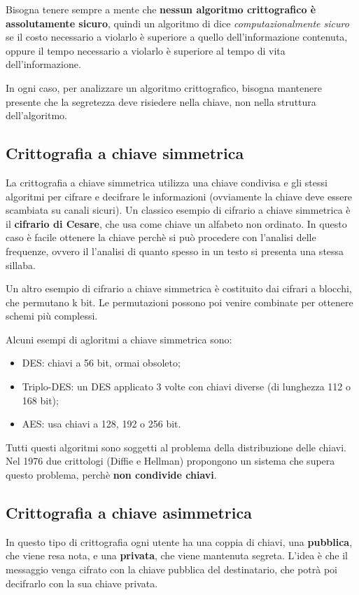 \documentclass[a4paper, 11pt]{article}
\begin{document}
\begin{multicols}{2}
		Bisogna tenere sempre a mente che \textbf{nessun algoritmo crittografico è assolutamente sicuro}, quindi un algoritmo di dice \textit{computazionalmente sicuro} se il costo necessario a violarlo è superiore a quello dell'informazione contenuta, oppure il tempo necessario a violarlo è superiore al tempo di vita dell'informazione.
		
		In ogni caso, per analizzare un algoritmo crittografico, bisogna mantenere presente che la segretezza deve risiedere nella chiave, non nella struttura dell'algoritmo.
		
		\subsection{Crittografia a chiave simmetrica}
		La crittografia a chiave simmetrica utilizza una chiave condivisa e gli stessi algoritmi per cifrare e decifrare le informazioni (ovviamente la chiave deve essere scambiata su canali sicuri).
		Un classico esempio di cifrario a chiave simmetrica è il \textbf{cifrario di Cesare}, che usa come chiave un alfabeto non ordinato. In questo caso è facile ottenere la chiave perchè si può procedere con l'analisi delle frequenze, ovvero il l'analisi di quanto spesso in un testo si presenta una stessa sillaba.
		
		Un altro esempio di cifrario a chiave simmetrica è costituito dai cifrari a blocchi, che permutano k bit. Le permutazioni possono poi venire combinate per ottenere schemi più complessi.
		
		Alcuni esempi di agloritmi a chiave simmetrica sono:
		\begin{itemize}
			\item DES: chiavi a 56 bit, ormai obsoleto;
			\item Triplo-DES: un DES applicato 3 volte con chiavi diverse (di lunghezza 112 o 168 bit);
			\item AES: usa chiavi a 128, 192 o 256 bit.
		\end{itemize}
	
		Tutti questi algoritmi sono soggetti al problema della distribuzione delle chiavi. Nel 1976 due crittologi (Diffie e Hellman) propongono un sistema che supera questo problema, perchè \textbf{non condivide chiavi}.
		
		\subsection{Crittografia a chiave asimmetrica}
		In questo tipo di crittografia ogni utente ha una coppia di chiavi, una \textbf{pubblica}, che viene resa nota, e una \textbf{privata}, che viene mantenuta segreta. L'idea è che il messaggio venga cifrato con la chiave pubblica del destinatario, che potrà poi decifrarlo con la sua chiave privata.
		

\end{multicols}
\end{document}
